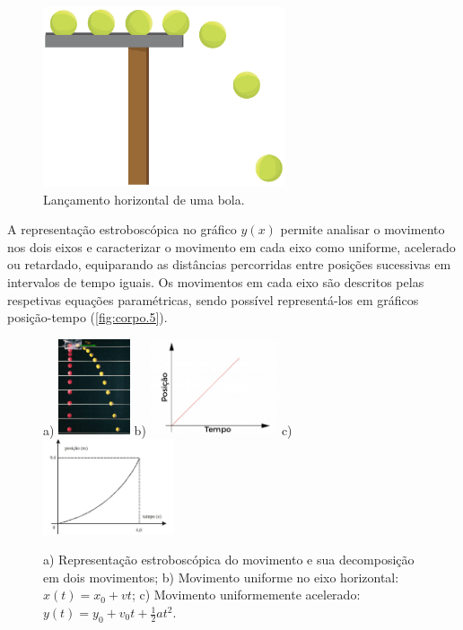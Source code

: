 \documentclass[a4paper,11pt,oneside]{report}
\begin{document}
\begin{figure}[h]
    \center
    \includegraphics[height=150pt]{figuras/124.png}
    \caption{Lançamento horizontal de uma bola.}
    \label{fig:corpo.4}
\end{figure}

A representação estroboscópica no gráfico \(y(x)\) permite analisar o movimento
nos dois eixos e caracterizar o movimento em cada eixo como uniforme, acelerado ou retardado,
equiparando as distâncias percorridas entre posições sucessivas em intervalos de tempo iguais. 
Os movimentos em cada eixo são descritos pelas respetivas equações paramétricas, sendo possível
representá-los em gráficos posição-tempo (\autoref{fig:corpo.5}).

\begin{figure}[h]
    \center
    a) \includegraphics[height=80pt]{figuras/estroboscopica.jpg}
    b) \includegraphics[height=80pt]{figuras/mvu.png}
    c) \includegraphics[height=80pt]{figuras/muva.png}
    \caption{a) Representação estroboscópica do movimento e sua decomposição em dois
    movimentos; b) Movimento uniforme no eixo horizontal: $x(t)=x_0+vt$; c) Movimento uniformemente
    acelerado: $y(t)=y_0+v_0t+\frac{1}{2}at^2 $.}
    \label{fig:corpo.5}
\end{figure}
\end{document}
